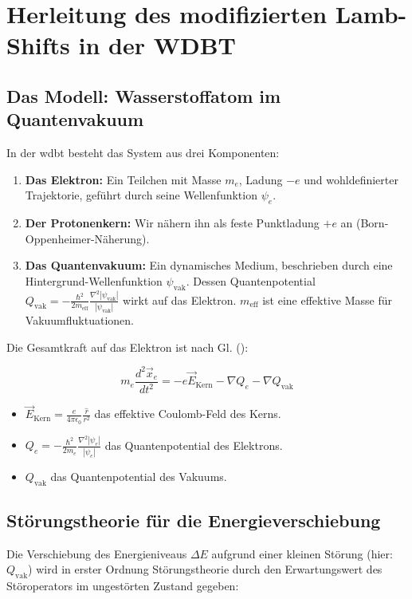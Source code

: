 \chapter{Herleitung des modifizierten Lamb-Shifts in der WDBT}
\label{att:lamb_shift}

\section{Das Modell: Wasserstoffatom im Quantenvakuum}
In der \gls{wdbt} besteht das System aus drei Komponenten:

\begin{enumerate}
    \item \textbf{Das Elektron:} Ein Teilchen mit Masse $m_e$, Ladung $-e$ und wohldefinierter Trajektorie, geführt durch seine Wellenfunktion $\psi_e$.
    \item \textbf{Der Protonenkern:} Wir nähern ihn als feste Punktladung $+e$ an (Born-Oppenheimer-Näherung).
    \item \textbf{Das Quantenvakuum:} Ein dynamisches Medium, beschrieben durch eine Hintergrund-Wellenfunktion $\psi_\text{vak}$. Dessen Quantenpotential $Q_{\text{vak}} = -\frac{\hbar^2}{2m_{\text{eff}}} \frac{\nabla^2 \left|{\psi_{\text{vak}}}\right|}{\left|{\psi_{\text{vak}}}\right|}$ wirkt auf das Elektron. $m_\text{eff}$ ist eine effektive Masse für Vakuumfluktuationen.
\end{enumerate}

Die Gesamtkraft auf das Elektron ist nach Gl. ():

\begin{equation}
    \label{eq:wdbt_lamb_kraft}
    m_e \frac{d^2\vec{x}_e}{dt^2} = -e\vec{E}_{\text{Kern}} - \nabla Q_e - \nabla Q_{\text{vak}}
\end{equation}

\begin{itemize}
    \item $\vec{E}_{\text{Kern}} = \frac{e}{4\pi\epsilon_0} \frac{\hat{r}}{r^2}$ das effektive Coulomb-Feld des Kerns.
    \item $Q_e = -\frac{\hbar^2}{2m_e} \frac{\nabla^2 |\psi_e|}{|\psi_e|}$ das Quantenpotential des Elektrons.
    \item $Q_\text{vak}$ das Quantenpotential des Vakuums.
\end{itemize}

\section{Störungstheorie für die Energieverschiebung}
Die Verschiebung des Energieniveaus $\Delta E$ aufgrund einer kleinen Störung (hier: $Q_\text{vak}$) wird in erster Ordnung Störungstheorie durch den Erwartungswert des Störoperators im ungestörten
Zustand gegeben:

